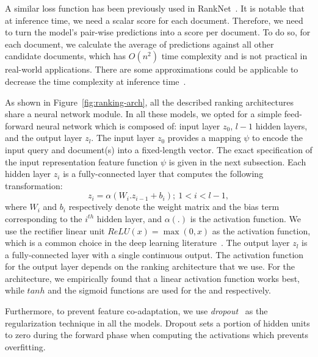 A similar loss function has been previously used in RankNet~\citep{Burges:2005}. It is notable that at inference time, we need a scalar score for each document. Therefore, we need to turn the model's pair-wise predictions into a score per document. To do so, for each document, we calculate the average of predictions against all other candidate documents, which has $O(n^2)$ time complexity and is not practical in real-world applications. There are some approximations could be applicable to decrease the time complexity at inference time~\citep{Wauthier:2013}.

\medskip
As shown in Figure~\ref{fig:ranking-arch}, all the described ranking architectures share a neural network module. In all these models, we opted for a simple feed-forward neural network which is composed of: input layer $z_0$, $l-1$ hidden layers, and the output layer $z_l$. The input layer $z_0$ provides a mapping $\psi$ to encode the input query and document(s) into a fixed-length vector.
The exact specification of the input representation feature function $\psi$ is given in the next subsection. 
Each hidden layer $z_i$ is a fully-connected layer that computes the following transformation:
\begin{equation}
    z_i = \alpha(W_i.z_{i-1} + b_i); ~ 1<i<l-1,
\end{equation}
where $W_i$ and $b_i$ respectively denote the weight matrix and the bias term corresponding to the $i^{th}$ hidden layer, and $\alpha(.)$ is the activation function. We use the rectifier linear unit $\textit{ReLU}(x) = \max(0, x)$ as the activation function, which is a common choice in the deep learning literature~\citep{Lecun:2015}. 
The output layer $z_l$ is a fully-connected layer with a single continuous output. The activation function for the output layer depends on the ranking architecture that we use. For the \modelone architecture, we empirically found that a linear activation function works best, while $tanh$ and the sigmoid functions are used for the \modeltwo and \modelthree respectively.

Furthermore, to prevent feature co-adaptation, we use \emph{dropout}~\citep{Srivastava:2014} as the regularization technique in all the models. Dropout sets a portion of hidden units to zero during the forward phase when computing the activations which prevents overfitting.



